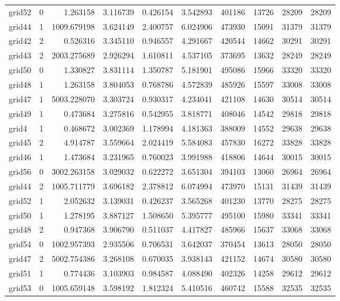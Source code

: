 \begin{longtable}{|l|r|r|r|r|r|r|r|r|r|}
grid52 & 0 & 1.263158 & 3.116739 & 0.426154 & 3.542893 & 401186 & 13726 & 28209 & 28209 \\
grid44 & 1 & 1009.679198 & 3.624149 & 2.400757 & 6.024906 & 473930 & 15091 & 31379 & 31379 \\
grid42 & 2 & 0.526316 & 3.345110 & 0.946557 & 4.291667 & 420544 & 14662 & 30291 & 30291 \\
grid43 & 2 & 2003.275689 & 2.926294 & 1.610811 & 4.537105 & 373695 & 13632 & 28249 & 28249 \\
grid50 & 0 & 1.330827 & 3.831114 & 1.350787 & 5.181901 & 495086 & 15966 & 33320 & 33320 \\
grid48 & 1 & 1.263158 & 3.804053 & 0.768786 & 4.572839 & 485926 & 15597 & 33008 & 33008 \\
grid47 & 1 & 5003.228070 & 3.303724 & 0.930317 & 4.234041 & 421108 & 14630 & 30514 & 30514 \\
grid49 & 1 & 0.473684 & 3.275816 & 0.542955 & 3.818771 & 408046 & 14542 & 29818 & 29818 \\
grid4 & 1 & 0.468672 & 3.002369 & 1.178994 & 4.181363 & 388009 & 14552 & 29638 & 29638 \\
grid45 & 2 & 4.914787 & 3.559664 & 2.024419 & 5.584083 & 457830 & 16272 & 33828 & 33828 \\
grid46 & 1 & 1.473684 & 3.231965 & 0.760023 & 3.991988 & 418806 & 14644 & 30015 & 30015 \\
grid56 & 0 & 3002.263158 & 3.029032 & 0.622272 & 3.651304 & 394103 & 13060 & 26964 & 26964 \\
grid44 & 2 & 1005.711779 & 3.696182 & 2.378812 & 6.074994 & 473970 & 15131 & 31439 & 31439 \\
grid52 & 1 & 2.052632 & 3.139031 & 0.426237 & 3.565268 & 401230 & 13770 & 28275 & 28275 \\
grid50 & 1 & 1.278195 & 3.887127 & 1.508650 & 5.395777 & 495100 & 15980 & 33341 & 33341 \\
grid48 & 2 & 0.947368 & 3.906790 & 0.511037 & 4.417827 & 485966 & 15637 & 33068 & 33068 \\
grid54 & 0 & 1002.957393 & 2.935506 & 0.706531 & 3.642037 & 370454 & 13613 & 28050 & 28050 \\
grid47 & 2 & 5002.754386 & 3.268108 & 0.670035 & 3.938143 & 421152 & 14674 & 30580 & 30580 \\
grid51 & 1 & 0.774436 & 3.103903 & 0.984587 & 4.088490 & 402326 & 14258 & 29612 & 29612 \\
grid53 & 0 & 1005.659148 & 3.598192 & 1.812324 & 5.410516 & 460742 & 15588 & 32535 & 32535 \\

\end{longtable}
